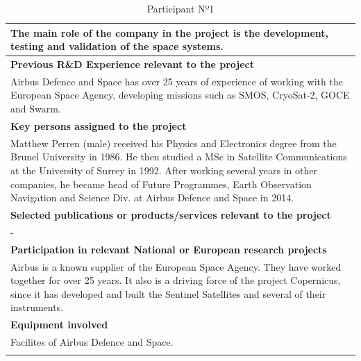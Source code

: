 \begin{longtable}[H]{|p{0.7cm}|p{4cm}|p{7cm}|p{1.3cm}|}
	\multicolumn{4}{|p{14.5cm}|}{The main role of the company in the project is the development, testing and validation of the space systems.}  \\ \hline
	
	\multicolumn{4}{|p{14.5cm}|}{\textbf{Previous R\&D Experience relevant to the project}}  \\ \hline
	
	\multicolumn{4}{|p{13cm}|}{Airbus Defence and Space has over 25 years of experience of working with the European Space Agency, developing missions such as SMOS, CryoSat-2, GOCE and Swarm.}  \\ \hline
	
	\multicolumn{4}{|p{13cm}|}{\textbf{Key persons assigned to the project}}   \\ \hline
	
	
	\multicolumn{4}{|p{14.5cm}|}{Matthew Perren (male) received his Physics and Electronics degree from the Brunel University in 1986. He then studied a MSc in Satellite Communications at the University of Surrey in 1992. After working several years in other companies, he became head of Future Programmes, Earth Observation Navigation and Science Div. at Airbus Defence and Space in 2014.}  \\ \hline
	
	\multicolumn{4}{|p{13cm}|}{\textbf{Selected publications or products/services relevant to the project}}  \\ \hline
	
	\multicolumn{4}{|p{14.5cm}|}{-}  \\ \hline
	
	\multicolumn{4}{|p{13cm}|}{\textbf{Participation in relevant National or European research projects}}  \\ \hline
	
	\multicolumn{4}{|p{14.5cm}|}{Airbus is a known supplier of the European Space Agency. They have worked together for over 25 years. It also is a driving force of the project Copernicus, since it has developed and built the Sentinel Satellites and several of their instruments.}  \\ \hline
	
	\multicolumn{4}{|p{13cm}|}{\textbf{Equipment involved}}  \\ \hline
	
	\multicolumn{4}{|p{14.5cm}|}{Facilites of Airbus Defence and Space.}  \\ \hline
	\caption{Participant Nº1}
\end{longtable}

